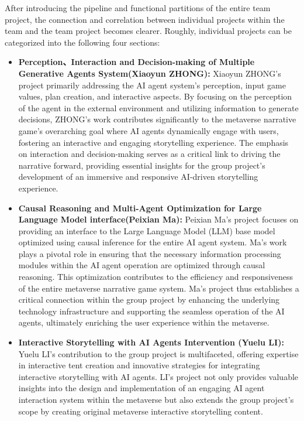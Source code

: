 After introducing the pipeline and functional partitions of the entire team project, the connection and correlation between individual projects within the team and the team project becomes clearer. 
Roughly, individual projects can be categorized into the following four sections:
\begin{itemize}
    \item \textbf{Perception、Interaction and Decision-making of Multiple Generative Agents System(Xiaoyun ZHONG):}
    Xiaoyun ZHONG's project primarily addressing the AI agent system's perception, input game values, plan creation, and interactive aspects. 
    By focusing on the perception of the agent in the external environment and utilizing information to generate decisions, 
    ZHONG's work contributes significantly to the metaverse narrative game's overarching goal where AI agents dynamically engage with users, fostering an interactive and engaging storytelling experience. 
    The emphasis on interaction and decision-making serves as a critical link to driving the narrative forward, providing essential insights for the group project's development of an immersive and responsive AI-driven storytelling experience.
    \item \textbf{Causal Reasoning and Multi-Agent Optimization for Large Language Model interface(Peixian Ma):}
    Peixian Ma's project focuses on providing an interface to the Large Language Model (LLM) base model optimized using causal inference for the entire AI agent system. 
    Ma's work plays a pivotal role in ensuring that the necessary information processing modules within the AI agent operation are optimized through causal reasoning. 
    This optimization contributes to the efficiency and responsiveness of the entire metaverse narrative game system. 
    Ma's project thus establishes a critical connection within the group project by enhancing the underlying technology infrastructure and supporting the seamless operation of the AI agents, ultimately enriching the user experience within the metaverse.
    \item \textbf{Interactive Storytelling with AI Agents Intervention (Yuelu LI):}
    Yuelu LI's contribution to the group project is multifaceted, offering expertise in interactive tent creation and innovative strategies for integrating interactive storytelling with AI agents. 
    LI's project not only provides valuable insights into the design and implementation of an engaging AI agent interaction system within the metaverse but also extends the group project's scope by creating original metaverse interactive storytelling content. 

\end{itemize}
